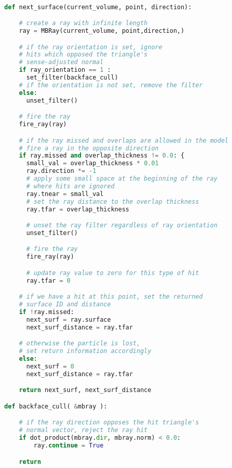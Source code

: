 \begin{lstlisting}[language=Python,basicstyle=\tiny,caption={Algorithm used in \textit{Next Surface} queries.},captionpos=b,label={alg:Next Surface Pseudo Code}]

  def next_surface(current_volume, point, direction):

      # create a ray with infinite length
      ray = MBRay(current_volume, point,direction,)

      # if the ray orientation is set, ignore
      # hits which opposed the triangle's
      # sense-adjusted normal
      if ray_orientation == 1 :
        set_filter(backface_cull)
      # if the orientation is not set, remove the filter
      else:
        unset_filter()

      # fire the ray
      fire_ray(ray)

      # if the ray missed and overlaps are allowed in the model
      # fire a ray in the opposite direction
      if ray.missed and overlap_thickness != 0.0: {
        small_val = overlap_thickness * 0.01
        ray.direction *= -1
        # apply some small space at the beginning of the ray
        # where hits are ignored
        ray.tnear = small_val
        # set the ray distance to the overlap thickness
        ray.tfar = overlap_thickness

        # unset the ray filter regardless of ray orientation
        unset_filter()

        # fire the ray
        fire_ray(ray)

        # update ray value to zero for this type of hit
        ray.tfar = 0

      # if we have a hit at this point, set the returned
      # surface ID and distance
      if !ray.missed:
        next_surf = ray.surface
        next_surf_distance = ray.tfar

      # otherwise the particle is lost,
      # set return information accordingly
      else:
        next_surf = 0
        next_surf_distance = ray.tfar

      return next_surf, next_surf_distance

  def backface_cull( &mbray ):

      # if the ray direction opposes the hit triangle's
      # normal vector, reject the ray hit
      if dot_product(mbray.dir, mbray.norm) < 0.0:
          ray.continue = True

      return

\end{lstlisting}

